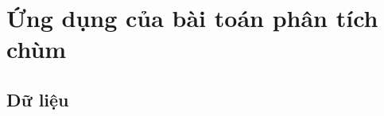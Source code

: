 \documentclass[a4paper,oneside]{book} %
\theoremstyle{plain}
\theoremstyle{plain}
\theoremstyle{nonumberplain}
\begin{document}
%
%
%







\section{Ứng dụng của bài toán phân tích chùm}









\subsection{Dữ liệu}
\end{document}
